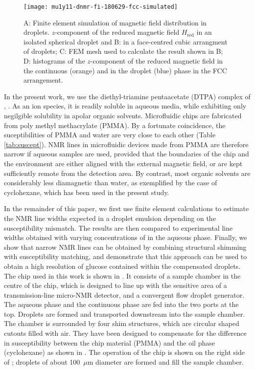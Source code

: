 \begin{figure}
  \begin{center}
    \texttt{[image: mu1y11-dnmr-fi-180629-fcc-simulated]}
  \end{center}
  \caption{A: Finite element simulation of magnetic field distribution in droplets.
      $z$-component of the reduced magnetic field $H_\text{red}$ in an isolated spherical droplet
      and B: in a face-centred cubic arrangment of droplets; C: FEM mesh used
      to calculate the result shown in B; D: histograms of the $z$-component
      of the reduced magnetic field in the continuous (orange) and in the droplet (blue) phase
      in the FCC arrangement.
    }
  \label{fig:FEM-fcc}
\end{figure}



In the present work, we use the diethyl-triamine pentaacetate (DTPA) complex
of , . As an ion species, it is readily soluble
in aqueous media, while exhibiting only negilgible solubility in apolar organic
solvents. Microfluidic chips are fabricated from poly methyl methacrylate (PMMA).
By a fortunate coincidence, the suceptibilities of PMMA and
water are very close to
each other (Table \ref{tab:suscept}).  NMR lines
in microfluidic devices made from PMMA are therefore narrow
if  aqueous
samples are used, provided that the boundaries of the chip and the environment
are either aligned with the external magnetic field, or are kept sufficiently
remote from the detection area.
 By contrast, most organic solvents are
considerably less diamagnetic than water, as exemplified by the
case of cyclohexane, which has been used in the present study.



In the remainder of this paper, we first use
finite element calculations to estimate
the NMR line widths expected in a droplet emulsion
depending on the susceptibility mismatch.
The results are then compared to experimental
line widths obtained with varying concentrations
of  in the aqueous phase. Finally,
we show that narrow NMR lines
can be obtained by
combining structural shimming \cite{Ryan:2014hl} with
susceptibility matching, and demonstrate that this
approach can be used to obtain a high resolution of glucose contained within the compensated droplets.
The chip used in this work is shown in . It consists of a sample
chamber in the centre of the chip, which is designed to line up with
the sensitive area of a transmission-line
micro-NMR detector,\cite{Finch:2016gv} and a convergent flow droplet
generator. The aqueous phase and the continuous
phase are fed into the two ports at the top. Droplets are
formed and transported downstream into the sample chamber.
 The chamber is surrounded by four shim structures, which are circular
 shaped cutouts filled with air. They have been designed to compensate
 for the difference in susceptibility between the chip material (PMMA)
 and the oil phase (cyclohexane) as shown in . The operation of the chip is shown
 on the right side of ; droplets of about 100~$\mu$m diameter are formed and
 fill the sample chamber.



